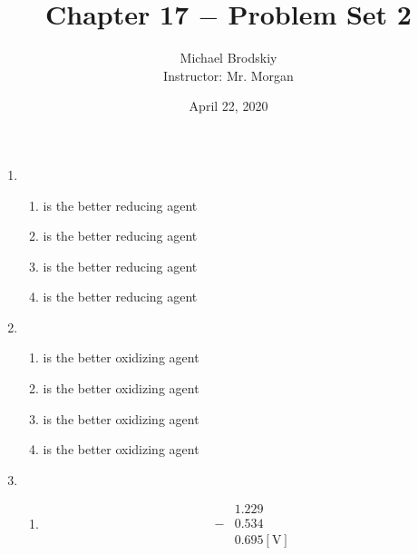 \documentclass[12pt]{article}
\title{Chapter 17 $-$ Problem Set 2}
\date{April 22, 2020}
\author{Michael Brodskiy\\ \small Instructor: Mr. Morgan}
\begin{document}
\maketitle

\begin{enumerate}

  \item

    \begin{enumerate}

      \item {} is the better reducing agent

      \item {} is the better reducing agent

      \item {} is the better reducing agent

      \item {} is the better reducing agent

    \end{enumerate}

  \item

    \begin{enumerate}

      \item {} is the better oxidizing agent

      \item {} is the better oxidizing agent

      \item {} is the better oxidizing agent

      \item {} is the better oxidizing agent

    \end{enumerate}

  \item 

    \begin{enumerate}

      \item {}

        \begin{equation}
          \begin{split}
            \,\,&1.229\\
            \,\,-&0.534\\
            \hline
            \,\,&0.695[\si{\volt}]
          \end{split}
          \label{1}
        \end{equation}


\end{enumerate}
\end{enumerate}
\end{document}
